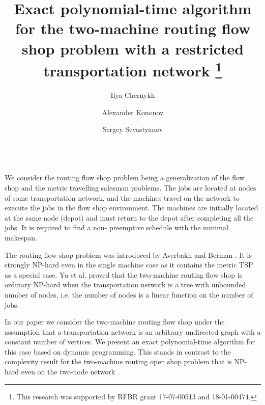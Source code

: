 
\title{Exact polynomial-time algorithm for the two-machine routing flow shop problem with a restricted transportation network
\thanks{This research was supported by RFBR grant 17-07-00513 and 18-01-00474.} }
%
%
\author{Ilya Chernykh \and
Alexander Kononov \and
Sergey Sevastyanov} 
%
%
%

\maketitle              %

\\

We consider the routing flow shop problem being a generalization of the flow shop and the metric travelling salesman problems.
The jobs are located at nodes of some transportation network, and the machines travel on the network to execute the jobs in the flow shop environment. 
The machines are initially located at the same node (depot) and must return to the depot after completing all the jobs. 
It is required to find a non- preemptive schedule with the minimal makespan.

The routing flow shop problem was introduced by Averbakh and Berman \cite{AverbakhBerman}. 
It is strongly NP-hard even in the single machine case as it contains the metric TSP as a special case.
Yu et al. \cite{Yu} proved that the two-machine routing flow shop is ordinary NP-hard when the transportation network is a tree
with unbounded number of nodes, i.e. the number of nodes is a linear function on the number of jobs.

In our paper we consider the two-machine routing flow shop under the assumption that a transportation network is an arbitrary undirected graph with a constant number of vertices. 
We present an exact polynomial-time algorithm for this case based on dynamic programming. 
This stands in contrast to the complexity result for the two-machine routing open shop problem
that is NP-hard even on the two-node network \cite{ABC}.






